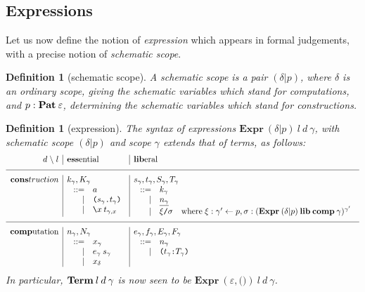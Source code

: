 \documentclass{jfp1}
\newtheorem{definition}[theorem]{Definition}
\newcommand{\fsl}{\texttt{/}}
\newcommand{\emp}{\varepsilon}
\newcommand{\Pa}[1]{\texttt{(}#1\texttt{)}}
\newcommand{\dt}{\texttt{.}}
\newcommand{\cn}[2]{\Pa{#1 \dt #2}}
\newcommand{\hb}{\texttt{:}}
\newcommand{\ra}[2]{\Pa{#1 \hb #2}}
\newcommand{\Ne}{\underline}
\begin{document}
\subsection{Expressions}

Let us now define the notion of \emph{expression} which appears in
formal judgements, with a precise notion of \emph{schematic scope}.

\newcommand{\ssc}[2]{(#1|#2)}
\begin{definition}[schematic scope]
  A schematic scope is a pair $\ssc\delta p$, where $\delta$ is an
  ordinary scope, giving the schematic variables which stand for
  computations, and $p : \Pat\emp$, determining the schematic
  variables which stand for constructions.
\end{definition}

\newcommand{\Ex}[4]{\textbf{Expr}\:#1\:#2\:#3\:#4}
\begin{definition}[expression]
  The syntax of expressions $\Ex{\ssc\delta p}ld\gamma$, with
  schematic scope $\ssc\delta p$ and scope $\gamma$ extends that
  of terms, as follows:
\[\begin{array}{r|l|l}
 d \;\backslash\; l& \ess\mbox{ential} & \lib\mbox{eral} \\
\hline
    \cons{truction} & k_\gamma, K_\gamma & s_\gamma, t_\gamma, S_\gamma, T_\gamma \\
    & \;\begin{array}[t]{rl}
          ::= & a \\
          | & \cn{s_\gamma}{t_\gamma} \\
          | & \la xt_{\gamma,x}
        \end{array}
    & \;\begin{array}[t]{rl}
          ::= & k_\gamma \\
          | & \Ne{n_\gamma} \\
          | & \xi\fsl\sigma \quad\mbox{where}\;
              \xi : \gamma'\from p, \sigma : (\Ex{\ssc\delta p}\lib\comp\gamma)^{\gamma'}
        \end{array}
    \\
    \hline
    \comp\mbox{utation} & n_\gamma, N_\gamma & e_\gamma, f_\gamma, E_\gamma, F_\gamma \\
    & \;\begin{array}[t]{rl}
          ::= & x_\gamma \\
          | & e_\gamma\:s_\gamma \\
          | & x_\delta
        \end{array}
    & \;\begin{array}[t]{rl}
          ::= & n_\gamma \\
          | & \ra{t_\gamma}{T_\gamma}
        \end{array}
    \\
  \end{array}\]
  In particular, $\mathbf{Term}\:l\:d\:\gamma$ is now seen to be $\Ex{(\emp,\Pa{})}ld\gamma$.
\end{definition}
\end{document}

